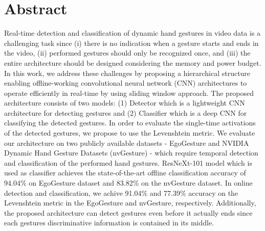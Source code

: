 \chapter*{Abstract}
Real-time detection and classification of dynamic hand gestures in video data is a challenging task since (i) there is no indication when a gesture starts and ends in the video, (ii) performed gestures should only be recognized once, and (iii) the entire architecture should be designed considering the memory and power budget. In this work, we address these challenges by proposing a hierarchical structure enabling offline-working convolutional neural network (CNN) architectures to operate efficiently in real-time by using sliding window approach. The proposed architecture consists of two models: (1) Detector which is a lightweight CNN architecture for detecting gestures and (2) Classifier which is a deep CNN for classifying the detected gestures. In order to evaluate the single-time activations of the detected gestures, we propose to use the Levenshtein metric. We evaluate our architecture on two publicly available datasets - EgoGesture and NVIDIA Dynamic Hand Gesture Datasets (nvGesture) - which require temporal detection and classification of the performed hand gestures. ResNeXt-101 model which is used as classifier achieves the state-of-the-art offline classification accuracy of 94.04\% on EgoGesture dataset and 83.82\% on the nvGesture dataset. In online detection and classification, we achive 91.04\% and 77.39\% accuracy on the Levenshtein metric in the EgoGesture and nvGesture, respectively. Additionally, the proposed architecture can detect gestures even before it actually ends since each gestures discriminative information is contained in its middle.  

